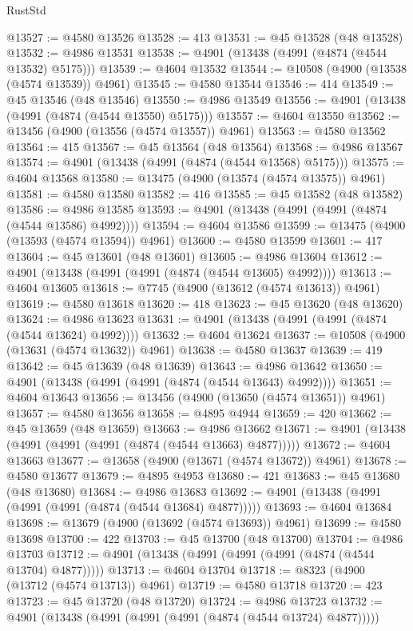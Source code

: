 \begin{lexlean}{RustStd}
\begin{coremodule}
@13527 := @4580 @13526
@13528 := 413
@13531 := @45 @13528 (@48 @13528)
@13532 := @4986 @13531
@13538 := @4901 (@13438 (@4991 (@4874 (@4544 @13532) @5175)))
@13539 := @4604 @13532
@13544 := @10508 (@4900 (@13538 (@4574 @13539)) @4961)
@13545 := @4580 @13544
@13546 := 414
@13549 := @45 @13546 (@48 @13546)
@13550 := @4986 @13549
@13556 := @4901 (@13438 (@4991 (@4874 (@4544 @13550) @5175)))
@13557 := @4604 @13550
@13562 := @13456 (@4900 (@13556 (@4574 @13557)) @4961)
@13563 := @4580 @13562
@13564 := 415
@13567 := @45 @13564 (@48 @13564)
@13568 := @4986 @13567
@13574 := @4901 (@13438 (@4991 (@4874 (@4544 @13568) @5175)))
@13575 := @4604 @13568
@13580 := @13475 (@4900 (@13574 (@4574 @13575)) @4961)
@13581 := @4580 @13580
@13582 := 416
@13585 := @45 @13582 (@48 @13582)
@13586 := @4986 @13585
@13593 := @4901 (@13438 (@4991 (@4991 (@4874 (@4544 @13586) @4992))))
@13594 := @4604 @13586
@13599 := @13475 (@4900 (@13593 (@4574 @13594)) @4961)
@13600 := @4580 @13599
@13601 := 417
@13604 := @45 @13601 (@48 @13601)
@13605 := @4986 @13604
@13612 := @4901 (@13438 (@4991 (@4991 (@4874 (@4544 @13605) @4992))))
@13613 := @4604 @13605
@13618 := @7745 (@4900 (@13612 (@4574 @13613)) @4961)
@13619 := @4580 @13618
@13620 := 418
@13623 := @45 @13620 (@48 @13620)
@13624 := @4986 @13623
@13631 := @4901 (@13438 (@4991 (@4991 (@4874 (@4544 @13624) @4992))))
@13632 := @4604 @13624
@13637 := @10508 (@4900 (@13631 (@4574 @13632)) @4961)
@13638 := @4580 @13637
@13639 := 419
@13642 := @45 @13639 (@48 @13639)
@13643 := @4986 @13642
@13650 := @4901 (@13438 (@4991 (@4991 (@4874 (@4544 @13643) @4992))))
@13651 := @4604 @13643
@13656 := @13456 (@4900 (@13650 (@4574 @13651)) @4961)
@13657 := @4580 @13656
@13658 := @4895 @4944
@13659 := 420
@13662 := @45 @13659 (@48 @13659)
@13663 := @4986 @13662
@13671 := @4901 (@13438 (@4991 (@4991 (@4991 (@4874 (@4544 @13663) @4877)))))
@13672 := @4604 @13663
@13677 := @13658 (@4900 (@13671 (@4574 @13672)) @4961)
@13678 := @4580 @13677
@13679 := @4895 @4953
@13680 := 421
@13683 := @45 @13680 (@48 @13680)
@13684 := @4986 @13683
@13692 := @4901 (@13438 (@4991 (@4991 (@4991 (@4874 (@4544 @13684) @4877)))))
@13693 := @4604 @13684
@13698 := @13679 (@4900 (@13692 (@4574 @13693)) @4961)
@13699 := @4580 @13698
@13700 := 422
@13703 := @45 @13700 (@48 @13700)
@13704 := @4986 @13703
@13712 := @4901 (@13438 (@4991 (@4991 (@4991 (@4874 (@4544 @13704) @4877)))))
@13713 := @4604 @13704
@13718 := @8323 (@4900 (@13712 (@4574 @13713)) @4961)
@13719 := @4580 @13718
@13720 := 423
@13723 := @45 @13720 (@48 @13720)
@13724 := @4986 @13723
@13732 := @4901 (@13438 (@4991 (@4991 (@4991 (@4874 (@4544 @13724) @4877)))))

\end{coremodule}
\end{lexlean}
